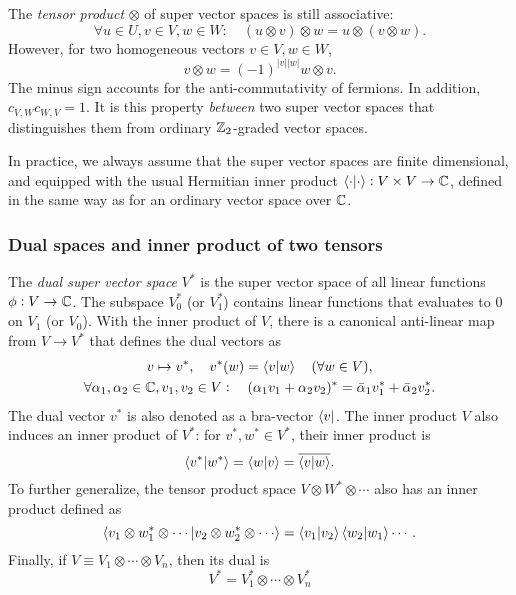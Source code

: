 \documentclass[11pt]{article}
\begin{document}
The \emph{tensor product} $\otimes$ of super vector spaces is still associative:
\begin{equation}
    \forall u \in U, v \in V, w \in W:
    \quad
    (u \otimes v) \otimes w
    = u \otimes (v \otimes w).
\end{equation}
However, for two homogeneous vectors $v \in V, w \in W$, 
\begin{equation}
    v \otimes w = 
    (-1)^{|v||w|} w \otimes v.
    \label{eq:fermion-sign}
\end{equation}
The minus sign accounts for the anti-commutativity of fermions. In addition, $c_{V,W} c_{W,V} = 1$. It is this property \emph{between} two super vector spaces that distinguishes them from ordinary $\mathbb{Z}_2$-graded vector spaces. 

In practice, we always assume that the super vector spaces are finite dimensional, and equipped with the usual Hermitian inner product $\braket{\cdot | \cdot}: V \times V \to \mathbb{C}$, defined in the same way as for an ordinary vector space over $\mathbb{C}$. 

\subsubsection{Dual spaces and inner product of two tensors}

The \emph{dual super vector space} $V^*$ is the super vector space of all linear functions $\phi: V \to \mathbb{C}$. 
The subspace $V^*_0$ (or $V^*_1$) contains linear functions that evaluates to 0 on $V_1$ (or $V_0$). 
With the inner product of $V$, there is a canonical anti-linear map from $V \to V^*$ that defines the dual vectors as
\begin{gather}
    v \mapsto v^*, \quad
    v^*(w) = \braket{v|w}
    \quad (\forall w \in V), 
    \\
    \forall \alpha_1, \alpha_2 \in \mathbb{C}, 
    v_1, v_2 \in V: \quad
    (\alpha_1 v_1 + \alpha_2 v_2)^*
    = \bar{\alpha}_1 v^*_1
    + \bar{\alpha}_2 v^*_2.
\end{gather}
The dual vector $v^*$ is also denoted as a bra-vector $\bra{v}$. The inner product $V$ also induces an inner product of $V^*$: for $v^*, w^* \in V^*$, their inner product is
\begin{equation}
    \braket{v^* | w^*} 
    = \braket{w|v} = \overline{\braket{v|w}}.
\end{equation}
To further generalize, the tensor product space $V \otimes W^* \otimes \cdots$ also has an inner product defined as
\begin{equation}
    \braket{
        v_1 \otimes w^*_1 \otimes \cdots | 
        v_2 \otimes w^*_2 \otimes \cdots
    } = \braket{v_1 | v_2}
    \braket{w_2 | w_1} \cdots.
    \label{eq:tensor-inner-product}
\end{equation}
Finally, if $V \equiv V_1 \otimes \cdots \otimes V_n$, then its dual is
\begin{equation}
    V^* = V^*_1 \otimes \cdots \otimes V^*_n
\end{equation}
\end{document}
